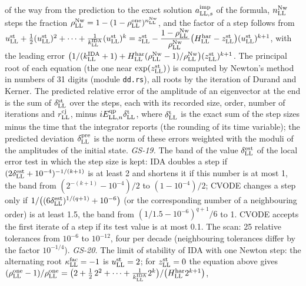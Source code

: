 \documentclass[
  10pt,
]{article}
\begin{document}
\begin{itemize}
  of the way from the prediction to the exact solution
  \(a^{\rm imp}_{{\rm LL},s}\) of the formula, \(n^{\rm Nw}_{\rm LL}\)
  steps the fraction
  \(\rho^{\rm Nw}_{\rm LL}=1-(1-\rho^{\rm one}_{\rm LL})^{n^{\rm Nw}_{\rm LL}}\),
  and the factor of a step follows from
  \(u^{\rm st}_{\rm LL}+\tfrac12(u^{\rm st}_{\rm LL})^2+\dots+\tfrac{1}{k^{\rm IDA}_{\rm LL}}(u^{\rm st}_{\rm LL})^{k}=z^{\rm st}_{\rm LL}-\dfrac{1-\rho^{\rm Nw}_{\rm LL}}{\rho^{\rm Nw}_{\rm LL}}\big(H^{\rm har}_{\rm LL}-z^{\rm st}_{\rm LL}\big)(u^{\rm st}_{\rm LL})^{k+1}\),
  with the leading error
  \(\big(1/(k^{\rm IDA}_{\rm LL}+1)+H^{\rm har}_{\rm LL}(\rho^{\rm Nw}_{\rm LL}-1)/\rho^{\rm Nw}_{\rm LL}\big)(z^{\rm st}_{\rm LL})^{k+1}\).
  The principal root of each equation (the one near
  \(\exp(z^{\rm st}_{\rm LL})\)) is computed by Newton's method in
  numbers of 31 digits (module \texttt{dd.rs}), all roots by the
  iteration of Durand and Kerner. The predicted relative error of the
  amplitude of an eigenvector at the end is the sum of
  \(\delta^{\rm st}_{\rm LL}\) over the steps, each with its recorded
  size, order, number of iterations and \(r^{\rm cj}_{\rm LL}\), minus
  \(iE^{\rm qp}_{{\rm LL},n}\delta^{\rm t}_{\rm LL}\), where
  \(\delta^{\rm t}_{\rm LL}\) is the exact sum of the step sizes minus
  the time that the integrator reports (the rounding of its time
  variable); the predicted deviation \(\delta^{\rm pre}_{\rm LL}\) is
  the norm of these errors weighted with the moduli of the amplitudes of
  the initial state. \emph{GS-19.} The band of the value
  \(\delta^{\rm est}_{\rm LL}\) of the local error test in which the
  step size is kept: IDA doubles a step if
  \((2\delta^{\rm est}_{\rm LL}+10^{-4})^{-1/(k+1)}\) is at least 2 and
  shortens it if this number is at most 1, the band from
  \((2^{-(k+1)}-10^{-4})/2\) to \((1-10^{-4})/2\); CVODE changes a step
  only if \(1/\big((6\delta^{\rm est}_{\rm LL})^{1/(q+1)}+10^{-6}\big)\)
  (or the corresponding number of a neighbouring order) is at least 1.5,
  the band from \((1/1.5-10^{-6})^{q+1}/6\) to 1. CVODE accepts the
  first iterate of a step if its test value is at most 0.1. The scan: 25
  relative tolerances from \(10^{-6}\) to \(10^{-12}\), four per decade
  (neighbouring tolerances differ by the factor \(10^{-1/4}\)).
  \emph{GS-20.} The limit of stability of IDA with one Newton step: the
  alternating root \(\kappa^{\rm fac}_{\rm LL}=-1\) is
  \(u^{\rm st}_{\rm LL}=2\); for \(z^{\rm st}_{\rm LL}=0\) the equation
  above gives
  \((\rho^{\rm one}_{\rm LL}-1)/\rho^{\rm one}_{\rm LL}=\big(2+\tfrac12\,2^2+\dots+\tfrac{1}{k^{\rm IDA}_{\rm LL}}2^{k}\big)/\big(H^{\rm har}_{\rm LL}2^{k+1}\big)\),

\end{itemize}
\end{document}
